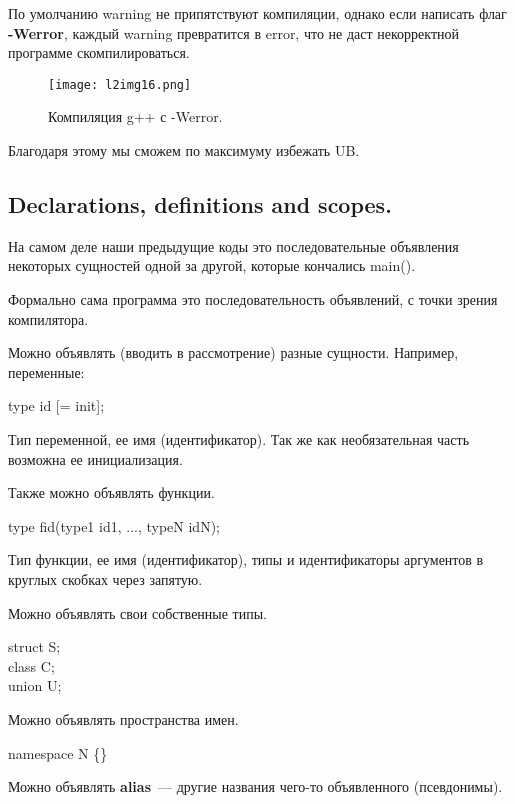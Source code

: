 По умолчанию warning не припятствуют компиляции, однако если написать флаг \textbf{-Werror}, каждый warning превратится в error, что не даст некорректной программе скомпилироваться.

\begin{figure}[h]
    \centering
    \texttt{[image: l2img16.png]}
    \caption{Компиляция g++ с -Werror.}
    \label{l2img16}
\end{figure}

Благодаря этому мы сможем по максимуму избежать UB.

\subsection{Declarations, definitions and scopes.}

На самом деле наши предыдущие коды это последовательные объявления некоторых сущностей одной за другой,
которые кончались main().

Формально сама программа это последовательность объявлений, с точки зрения компилятора.

Можно объявлять (вводить в рассмотрение) разные сущности.
Например, переменные:

\begin{center}
type id [= init];
\end{center}

Тип переменной, ее имя (идентификатор).
Так же как необязательная часть возможна ее инициализация.

Также можно объявлять функции.

\begin{center}
type fid(type1 id1, ..., typeN idN);
\end{center}

Тип функции, ее имя (идентификатор), типы и идентификаторы аргументов в круглых скобках через запятую.

Можно объявлять свои собственные типы.

\begin{center}
struct S; \\
class C; \\
union U;
\end{center}

Можно объявлять пространства имен.

\begin{center}
namespace N \{\}
\end{center}

Можно объявлять \textbf{alias}~--- другие названия чего-то объявленного (псевдонимы).

